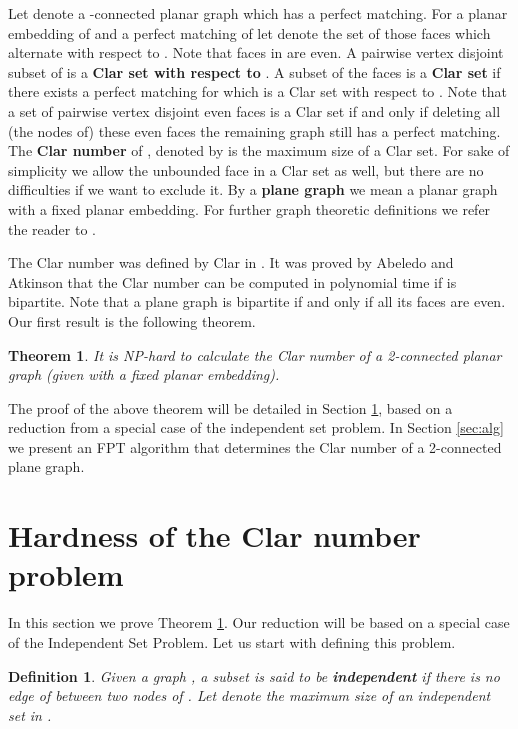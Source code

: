 \documentclass{article}
\newtheorem{theorem}{Theorem}
\newtheorem{defn}{Definition}
\begin{document}
Let  denote a -connected planar graph which has a perfect
matching. For a planar embedding of  and a perfect matching of 
let  denote the set of those faces which alternate with respect
to . Note that faces in  are even. A pairwise vertex disjoint
subset of  is a \textbf{Clar set with respect to }. A subset
 of the faces is a \textbf{Clar set} if there exists a perfect
matching  for which  is a Clar set with respect to .  Note
that a set of pairwise vertex disjoint even faces is a Clar set if and
only if deleting all (the nodes of) these even faces the remaining
graph still has a perfect matching. The \textbf{Clar number} of ,
denoted by  is the maximum size of a Clar set. For sake of
simplicity we allow the unbounded face in a Clar set as well, but
there are no difficulties if we want to exclude it. By a \textbf{
  plane graph} we mean a planar graph with a fixed planar embedding.
For further graph theoretic definitions we refer the reader to \cite{frank2011connections}.

The Clar number was defined by Clar in \cite{clar}. It was proved by
Abeledo and Atkinson \cite{abeledo_minmax} that the Clar number can be
computed in polynomial time if  is bipartite. Note that a plane
graph is bipartite if and only if all its faces are even. 
Our first result is the following theorem.



\begin{theorem}\label{thm:nph}
It is NP-hard to calculate the Clar number of a 2-connected planar
graph (given with a fixed planar embedding).
\end{theorem}

{The proof of the above theorem will be detailed in Section
  \ref{sec:compl}, based on a reduction from a special case of the
  independent set problem.} In Section \ref{sec:alg} we present an FPT
algorithm that determines the Clar number of a 2-connected plane
graph.



\section{Hardness of the Clar number problem}
\label{sec:compl}

In this section we prove Theorem \ref{thm:nph}. Our reduction will be
based on a special case of the Independent Set Problem. Let us start
with defining this problem.


\begin{defn}
Given a graph , a subset  is said to be
\textbf{independent} if there is no edge of  between two nodes of .
Let  denote the maximum size of an
independent set in .
\end{defn}
\end{document}

